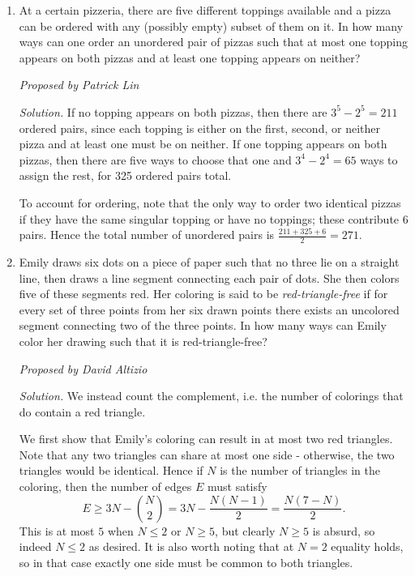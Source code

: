 \documentclass[10pt]{article}
\newcounter{enum}
\newcommand{\proposed}[1]
{
\vspace{5pt}
\noindent\textit{Proposed by #1}
}
\newcommand{\solution}
{
\vspace{5pt}
\noindent\textit{Solution.}\qquad
}
\begin{document}
\begin{enumerate}
\proposed{Phillip Wang}

\solution Call a clockwise move L and a counter-clockwise move R. Then she is at her starting position after ten seconds if the moves have 5 L's and 5 R's, 8 L's and 2 R's, or 2 L's and 8 R's, which can occur in $\binom{10}{5} + 2\cdot\binom{10}{8} = 342$ ways. The answer is hence $\frac{342}{2^{10}} = \boxed{\tfrac{171}{512}}$.






\item At a certain pizzeria, there are five different toppings available and a pizza can be ordered with any (possibly empty) subset of them on it. In how many ways can one order an unordered pair of pizzas such that at most one topping appears on both pizzas and at least one topping appears on neither?

\proposed{Patrick Lin}

\solution If no topping appears on both pizzas, then there are $3^5 - 2^5 = 211$ ordered pairs, since each topping is either on the first, second, or neither pizza and at least one must be on neither. If one topping appears on both pizzas, then there are five ways to choose that one and $3^4 - 2^4 = 65$ ways to assign the rest, for 325 ordered pairs total.

\par To account for ordering, note that the only way to order two identical pizzas if they have the same singular topping or have no toppings; these contribute 6 pairs. Hence the total number of unordered pairs is $\frac{211+325+6}{2} = \boxed{271}$.





\newpage
\item Emily draws six dots on a piece of paper such that no three lie on a straight line, then draws a line segment connecting each pair of dots. She then colors five of these segments red. Her coloring is said to be \emph{red-triangle-free} if for every set of three points from her six drawn points there exists an uncolored segment connecting two of the three points. In how many ways can Emily color her drawing such that it is red-triangle-free?

\proposed{David Altizio}

\solution We instead count the complement, i.e. the number of colorings that do contain a red triangle.

\par We first show that Emily's coloring can result in at most two red triangles.  Note that any two triangles can share at most one side - otherwise, the two triangles would be identical.  Hence if $N$ is the number of triangles in the coloring, then the number of edges $E$ must satisfy \[E\geq 3N - \binom{N}2 = 3N - \dfrac{N(N-1)}2 = \dfrac{N(7-N)}2.\] This is at most $5$ when $N\leq 2$ or $N\geq 5$, but clearly $N\geq 5$ is absurd, so indeed $N\leq 2$ as desired.  It is also worth noting that at $N=2$ equality holds, so in that case exactly one side must be common to both triangles.


\end{enumerate}
\end{document}

